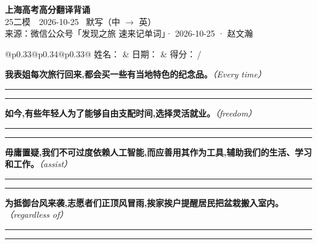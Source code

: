 \documentclass[11pt,a4paper]{article}
\newcommand{\num}[1]{\makebox[1.9em][r]{#1.}\hspace{0.3em}}
\newcommand{\wline}{\noindent\rule{\linewidth}{0.4pt}}
\newcommand{\prompt}[1]{\emph{\textcolor{tipblue}{\small（#1）}}}
\begin{document}
\pagestyle{plain}
\begin{center}
{\LARGE\bfseries 上海高考高分翻译背诵 }\\[0.25em]
{\large 25二模　2026-10-25 \quad\ 默写（中 $\to$ 英）}\\[0.35em]
{\footnotesize 来源：微信公众号「发现之旅 速来记单词」· 2026-10-25 · 赵文瀚}
\end{center}

\vspace{0.4em}
\noindent\begin{tabular}{@{}p{0.33\textwidth}@{}p{0.34\textwidth}@{}p{0.33\textwidth}@{}}
姓名：\underline{\hspace{2.0cm}} & 日期：\underline{\hspace{2.0cm}} & 得分：\underline{\hspace{1.4cm}}\,/ \\
\end{tabular}

\vspace{0.5em}

\vspace{0.8em}
\num{1}\textbf{我表姐每次旅行回来,都会买一些有当地特色的纪念品。}\prompt{Every time}

\vspace{0.3em}

\wline\vspace{0.3em}
\wline

\num{2}\textbf{如今,有些年轻人为了能够自由支配时间,选择灵活就业。}\prompt{freedom}

\vspace{0.3em}

\wline\vspace{0.3em}
\wline

\num{3}\textbf{毋庸置疑,我们不可过度依赖人工智能,而应善用其作为工具,辅助我们的生活、学习和工作。}\prompt{assist}

\vspace{0.3em}

\wline\vspace{0.3em}
\wline

\num{4}\textbf{为抵御台风来袭,志愿者们正顶风冒雨,挨家挨户提醒居民把盆栽搬入室内。}\prompt{regardless of}

\vspace{0.3em}

\wline\vspace{0.3em}
\wline
\end{document}
